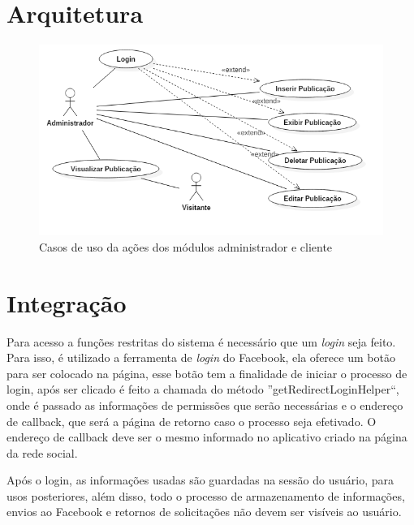 
\section{Arquitetura}
\begin{figure}[H]
\centering
\includegraphics[scale=0.6]{figuras/casosDeUso}
\caption{Casos de uso da ações dos módulos administrador e cliente}
\label{fig:casosDeUso}
\end{figure}




\section{Integração}
Para acesso a funções restritas do sistema é necessário que um \textit{login} seja feito. Para isso, é utilizado a ferramenta de \textit{login} do Facebook, ela oferece um botão para ser colocado na página, esse botão tem a finalidade de iniciar o processo de login, após ser clicado é feito a chamada do método ''getRedirectLoginHelper``, onde é passado as informações de permissões que serão necessárias e o endereço de callback, que será a página de retorno caso o processo seja efetivado. O endereço de callback deve ser o mesmo informado no aplicativo criado na página da rede social.

Após o login, as informações usadas são guardadas na sessão do usuário, para usos posteriores, além disso, todo o processo de armazenamento de informações, envios ao Facebook e retornos de solicitações não devem ser visíveis ao usuário. 

